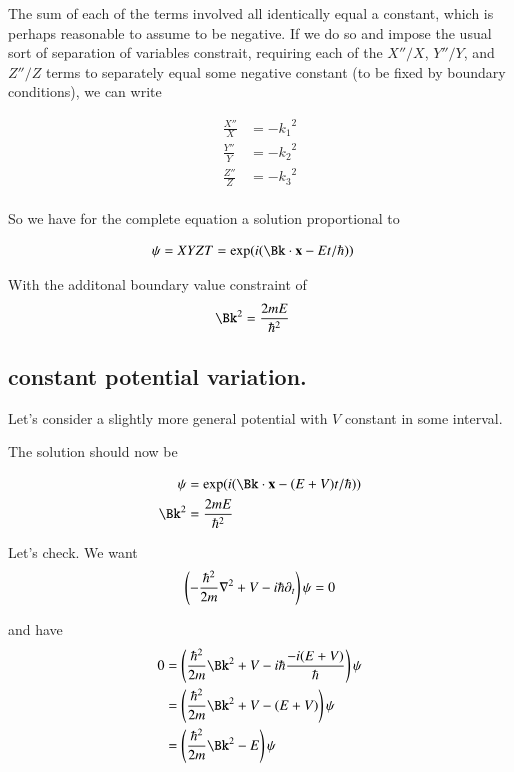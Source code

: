 \documentclass{article}
\begin{document}
The sum of each of the terms involved all identically equal a constant, which is perhaps
reasonable to assume to be negative.  If we do so and impose the usual sort of separation of
variables constrait, requiring each of the $X''/X$, $Y''/Y$, and $Z''/Z$ terms to separately
equal some negative constant (to be fixed by boundary conditions), we can write

\begin{align*}
\frac{X''}{X} &= -{k_1}^2 \\
\frac{Y''}{Y} &= -{k_2}^2 \\
\frac{Z''}{Z} &= -{k_3}^2 \\
\end{align*}

So we have for the complete equation a solution proportional to

\begin{align*}
\psi = X Y Z T &= \exp(i(\Bk \cdot \Bx - E t/\hbar))
\end{align*}

With the additonal boundary value constraint of
\begin{align*}
\Bk^2 &= \frac{2 m E}{\hbar^2}
\end{align*}

\subsection{ constant potential variation. }

Let's consider a slightly more general potential with $V$ constant in some interval.

The solution should now be

\begin{align*}
\psi &= \exp(i(\Bk \cdot \Bx - (E + V) t/\hbar)) \\
\Bk^2 &= \frac{2 m E}{\hbar^2}
\end{align*}

Let's check.  We want 
\begin{align*}
\left(-\frac{\hbar^2}{2m}\nabla^2 + V -i\hbar \partial_t\right)\psi = 0
\end{align*}

and have
\begin{align*}
0 &=
\left(\frac{\hbar^2}{2m}\Bk^2 + V -i\hbar \frac{-i(E + V)}{\hbar}\right)\psi \\
&= \left(\frac{\hbar^2}{2m}\Bk^2 + V -(E + V)\right)\psi \\
&= \left(\frac{\hbar^2}{2m}\Bk^2 - E\right)\psi \\
\end{align*}
\end{document}
